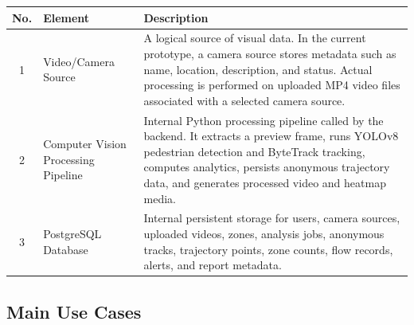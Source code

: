\documentclass[12pt,a4paper]{report}
\begin{document}
\begin{longtable}{|c|p{4.1cm}|p{8.8cm}|}
\hline
\rowcolor{HeaderBlue}
\textbf{No.} & \textbf{Element} & \textbf{Description} \\
\hline
1 & Video/Camera Source & A logical source of visual data. In the current prototype, a camera source stores metadata such as name, location, description, and status. Actual processing is performed on uploaded MP4 video files associated with a selected camera source. \\
\hline
2 & Computer Vision Processing Pipeline & Internal Python processing pipeline called by the backend. It extracts a preview frame, runs YOLOv8 pedestrian detection and ByteTrack tracking, computes analytics, persists anonymous trajectory data, and generates processed video and heatmap media. \\
\hline
3 & PostgreSQL Database & Internal persistent storage for users, camera sources, uploaded videos, zones, analysis jobs, anonymous tracks, trajectory points, zone counts, flow records, alerts, and report metadata. \\
\hline
\end{longtable}

\subsection{Main Use Cases}
\end{document}
